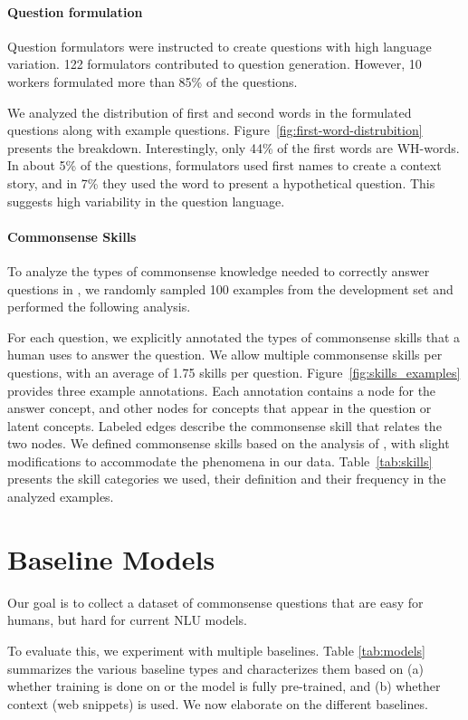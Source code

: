 \paragraph{Question formulation} Question formulators were instructed to create questions with high language variation. 122 formulators contributed to question generation. However, 10 workers formulated more than 85\% of the questions.

We analyzed the distribution of first and second words in the formulated questions along with example questions. Figure~\ref{fig:first-word-distrubition} presents the breakdown. Interestingly, only 44\% of the first words are WH-words. In about 5\% of the questions, formulators used first names to create a context story, and in 7\% they used the word  to present a hypothetical question. This suggests high variability in the question language.  

\paragraph{Commonsense Skills} To analyze the types of commonsense knowledge needed to correctly answer questions in \csqa{}, we randomly sampled 100 examples from the development set and performed the following analysis.

For each question, we explicitly annotated the types of commonsense skills that a human uses to answer the question. We allow multiple commonsense skills per questions, with an average of 1.75 skills per question. Figure~\ref{fig:skills_examples} provides three example annotations. Each annotation contains a node for the answer concept, and other nodes for concepts that appear in the question or latent concepts. Labeled edges describe the commonsense skill that relates the two nodes. We defined commonsense skills based on the analysis of , with slight modifications to accommodate the phenomena in our data. Table~\ref{tab:skills} presents the skill categories we used, their definition and their frequency in the analyzed examples.

\section{Baseline Models}
\label{sec:base}

Our goal is to collect a dataset of commonsense questions that are easy for humans, but hard for current NLU models. 

To evaluate this, we experiment with multiple baselines. Table \ref{tab:models} summarizes the various baseline types and characterizes them based on (a) whether training is done on \csqa{} or the model is fully pre-trained, and (b) whether context (web snippets) is used. We now elaborate on the different baselines.

